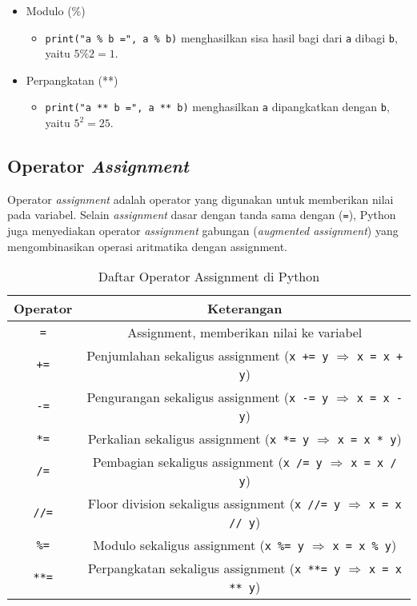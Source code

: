 \begin{itemize}
    \item Modulo (\%)
    \begin{itemize}
        \item \texttt{print("a \% b =", a \% b)} menghasilkan sisa hasil bagi dari \texttt{a} dibagi \texttt{b}, yaitu $5 \% 2 = 1$.
    \end{itemize}

    \item Perpangkatan (**)
    \begin{itemize}
        \item \texttt{print("a ** b =", a ** b)} menghasilkan \texttt{a} dipangkatkan dengan \texttt{b}, yaitu $5^2 = 25$.
    \end{itemize}
\end{itemize}

\subsection{Operator \textit{Assignment}}
Operator \textit{assignment} adalah operator yang digunakan untuk memberikan nilai pada variabel. 
Selain \textit{assignment} dasar dengan tanda sama dengan (\texttt{=}), Python juga menyediakan operator 
\textit{assignment} gabungan (\textit{augmented assignment}) yang mengombinasikan operasi aritmatika dengan assignment.

\begin{table}[H]
\centering
\begin{tabular}{|c|c|}
\hline
\textbf{Operator} & \textbf{Keterangan} \\
\hline
\texttt{=} & Assignment, memberikan nilai ke variabel \\
\hline
\texttt{+=} & Penjumlahan sekaligus assignment (\texttt{x += y} $\Rightarrow$ \texttt{x = x + y}) \\
\hline
\texttt{-=} & Pengurangan sekaligus assignment (\texttt{x -= y} $\Rightarrow$ \texttt{x = x - y}) \\
\hline
\texttt{*=} & Perkalian sekaligus assignment (\texttt{x *= y} $\Rightarrow$ \texttt{x = x * y}) \\
\hline
\texttt{/=} & Pembagian sekaligus assignment (\texttt{x /= y} $\Rightarrow$ \texttt{x = x / y}) \\
\hline
\texttt{//=} & Floor division sekaligus assignment (\texttt{x //= y} $\Rightarrow$ \texttt{x = x // y}) \\
\hline
\texttt{\%=} & Modulo sekaligus assignment (\texttt{x \%= y} $\Rightarrow$ \texttt{x = x \% y}) \\
\hline
\texttt{**=} & Perpangkatan sekaligus assignment (\texttt{x **= y} $\Rightarrow$ \texttt{x = x ** y}) \\
\hline
\end{tabular}
\caption{Daftar Operator Assignment di Python}
\end{table}

